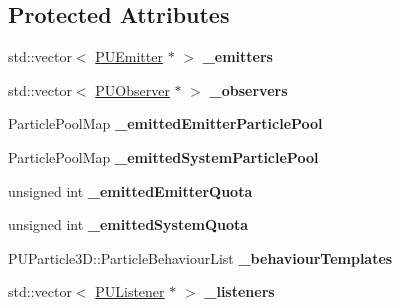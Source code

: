 \subsection*{Protected Attributes}
\begin{DoxyCompactItemize}
\item 
\mbox{\label{classPUParticleSystem3D_a81ee2ef33ab012a7d5efc52905db1c0e}} 
std\+::vector$<$ \hyperlink{classPUEmitter}{P\+U\+Emitter} $\ast$ $>$ {\bfseries \+\_\+emitters}
\item 
\mbox{\label{classPUParticleSystem3D_ae60b6c52fb3661f5ce193ec23113f80a}} 
std\+::vector$<$ \hyperlink{classPUObserver}{P\+U\+Observer} $\ast$ $>$ {\bfseries \+\_\+observers}
\item 
\mbox{\label{classPUParticleSystem3D_adcef7ed9f8854663eac93f39731fec58}} 
Particle\+Pool\+Map {\bfseries \+\_\+emitted\+Emitter\+Particle\+Pool}
\item 
\mbox{\label{classPUParticleSystem3D_a6ce7be930391694ee6d66bb6d9f780f6}} 
Particle\+Pool\+Map {\bfseries \+\_\+emitted\+System\+Particle\+Pool}
\item 
\mbox{\label{classPUParticleSystem3D_aceb4d8316bab74a90a6a01f1911c7392}} 
unsigned int {\bfseries \+\_\+emitted\+Emitter\+Quota}
\item 
\mbox{\label{classPUParticleSystem3D_ab383eb751908ae7b2acdf23742642362}} 
unsigned int {\bfseries \+\_\+emitted\+System\+Quota}
\item 
\mbox{\label{classPUParticleSystem3D_a08036254768dd3087b3a1c2b7e2df59c}} 
P\+U\+Particle3\+D\+::\+Particle\+Behaviour\+List {\bfseries \+\_\+behaviour\+Templates}
\item 
\mbox{\label{classPUParticleSystem3D_a5c51b8d7e75fad199e4f31eec580f215}} 
std\+::vector$<$ \hyperlink{classPUListener}{P\+U\+Listener} $\ast$ $>$ {\bfseries \+\_\+listeners}
\item 
\mbox{\label{classPUParticleSystem3D_a69480b0e24ba33e524fd99f64becd7c5}} 

\end{DoxyCompactItemize}
